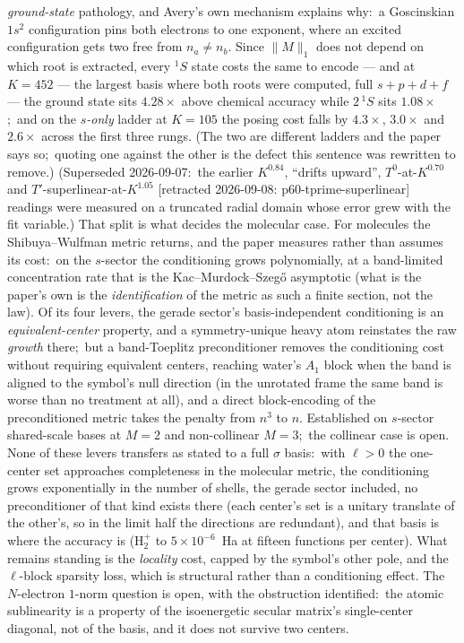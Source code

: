 \documentclass[aps,pra,twocolumn,superscriptaddress,longbibliography]{revtex4-2}
\begin{document}
\emph{ground-state} pathology, and Avery's own mechanism explains why:\ a
Goscinskian $1s^{2}$ configuration pins both electrons to one exponent, where an
excited configuration gets two free from $n_a\neq n_b$.  Since $\|M\|_1$ does
not depend on which root is extracted, every $^{1}S$ state costs the same to
encode --- and at $K=452$ --- the largest basis where both roots were computed, full
$s\!+\!p\!+\!d\!+\!f$ --- the ground state sits $4.28\times$ above chemical
accuracy while $2\,^{1}S$ sits $1.08\times$;\ and on the \emph{$s$-only} ladder at
$K=105$ the posing cost falls by $4.3\times$, $3.0\times$ and $2.6\times$ across
the first three rungs.  (The two are different ladders and the paper says so;\
quoting one against the other is the defect this sentence was rewritten to
remove.)  (Superseded 2026-09-07:\ the earlier $K^{0.84}$,
``drifts upward'', $T^0$-at-$K^{0.70}$ and $T'$-superlinear-at-$K^{1.05}$ [retracted 2026-09-08: p60-tprime-superlinear]
readings were measured on a truncated radial domain whose error grew with
the fit variable.)  That split is what decides the molecular case.  For molecules the Shibuya--Wulfman metric returns, and the paper
measures rather than assumes its cost:\ on the $s$-sector the conditioning grows
polynomially, at a band-limited concentration rate that is the
Kac--Murdock--Szeg\H{o} asymptotic (what is the paper's own is the
\emph{identification} of the metric as such a finite section, not the law).
Of its four levers, the gerade sector's basis-independent conditioning is an
\emph{equivalent-center} property, and a symmetry-unique heavy atom reinstates
the raw \emph{growth} there;\ but a band-Toeplitz preconditioner removes the
conditioning cost without requiring equivalent centers, reaching water's $A_1$
block when the band is aligned to the symbol's null direction (in the unrotated
frame the same band is worse than no treatment at all), and a direct block-encoding of the preconditioned metric takes the
penalty from $n^3$ to $n$.  Established on $s$-sector shared-scale bases at
$M=2$ and non-collinear $M=3$;\ the collinear case is open.  None of these
levers transfers as stated to a full $\sigma$ basis:\ with $\ell>0$ the
one-center set approaches completeness in the molecular metric, the conditioning grows
exponentially in the number of shells, the gerade sector included, no
preconditioner of that kind exists there (each center's set is a unitary
translate of the other's, so in the limit half the directions are redundant), and that
basis is where the accuracy is ($\mathrm{H}_2^+$ to $5\times10^{-6}$~Ha at
fifteen functions per center).  What remains standing is the \emph{locality} cost,
capped by the symbol's other pole, and the $\ell$-block sparsity loss, which is
structural rather than a conditioning effect.  The $N$-electron $1$-norm question is open, with the
obstruction identified:\ the atomic sublinearity is a property of the isoenergetic
secular matrix's single-center diagonal, not of the basis, and it does not
survive two centers.
\end{document}
